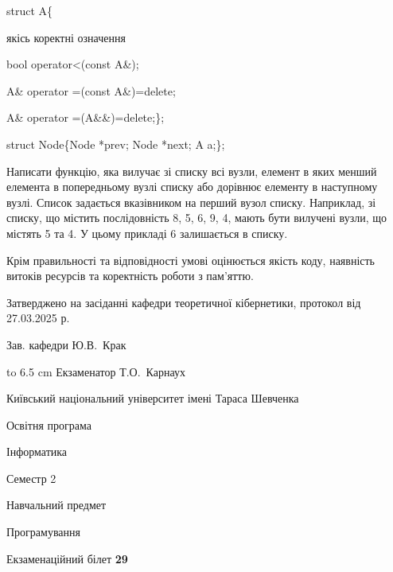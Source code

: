 \documentclass[12pt, ukrainian]{article}
\begin{document}
{struct A\{

\quad  якісь коректні означення 

\quad  bool operator<(const A\&); 

\quad A\& operator =(const A\&)=delete; 

\quad  A\& operator =(A\&\&)=delete;\};

struct Node\{Node *prev; Node *next; A a;\};

Написати функцію, яка вилучає зі списку всі вузли, елемент в яких менший елемента в попередньому вузлі списку або дорівнює елементу в наступному вузлі. Список задається вказівником на перший вузол списку. Наприклад, зі списку, що містить послідовність 8, 5, 6, 9, 4, мають бути вилучені вузли, що містять 5 та 4. У цьому прикладі 6 залишається в списку.

Крім правильності та відповідності умові оцінюється якість коду, наявність витоків ресурсів та коректність роботи з пам'яттю. 

}
{\smallskip\smallskip \begin {scriptsize} Затверджено на засіданні кафедри теоретичної кібернетики, протокол   від   27.03.2025 р.\par\smallskip\smallskip\smallskip\smallskip
{\parbox {6.5 cm} {Зав. кафедри \dotfill Ю.В.~Крак}}\hspace {0.7cm} {\hbox to 6.5 cm { Екзаменатор \dotfill Т.О.~Карнаух}} \end{scriptsize}}
\newpage
{{\begin {scriptsize}\par
{ \center  Київський національний університет імені Тараса Шевченка \par}
{\parbox {5 cm}{Освітня програма \hfill}{\parbox {7 cm}{Інформатика\hfill}}\parbox {6 cm}{\hfill Семестр 2}}\par
{\parbox {5 cm} {Навчальний предмет \hfill}\parbox {7 cm}{Програмування \hfill}\parbox {6cm}{\hfill}\par}\vspace{-15pt} \end{scriptsize}}{\center Екзаменаційний білет \No \textbf { 29 }\par}}
\end{document}
